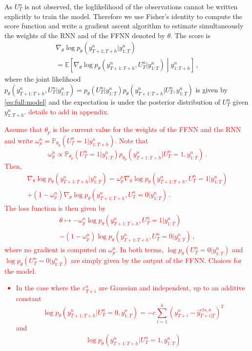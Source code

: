 \documentclass[letterpaper]{article} %
\newcommand{\ts}{y}
\newcommand{\etspred}{\hat{y}}
\begin{document}
As $U^n_T$ is not observed, the loglikelihood of the observations cannot be written explicitly to train the model. Therefore we use Fisher's identity to compute the score function and write a gradient ascent algorithm to estimate simultaneously the weights of the RNN and of the FFNN denoted by $\theta$. The score is
\begin{multline*}
\nabla_\theta \log p_\theta(\ts^n_{T+1:T+h}|\ts^n_{1:T})
\\ = \mathbb{E}\left[\nabla_\theta \log p_\theta(\ts^n_{T+1:T+h},U_T^n|\ts^n_{1:T})\middle|\ts^n_{1:T+h}\right]\,,
\end{multline*}
where the joint likelihood $p_\theta(\ts^n_{T+1:T+h},U_T^n|\ts^n_{1:T}) = p_\theta(U_T^n|\ts^n_{1:T})p_\theta(\ts^n_{T+1:T+h}|U_T^n,\ts^n_{1:T})$ is given by \eqref{eq:full:model} and the expectation is under the posterior distribution of $U_T^n$ given $\ts^n_{1:T+h}$.  \textcolor{red}{details to add in appendix.} \textcolor{red}{Assume that $\theta_p$ is the current value for the weights of the FFNN and the RNN and write $\omega_p^n = \mathbb{P}_{\theta_p}(U_T^n = 1|\ts^n_{1:T+h})$. Note that
$$
\omega_p^n \propto \mathbb{P}_{\theta_p}(U_T^n = 1|\ts^n_{1:T})p_{\theta_p}(\ts^n_{T+1:T+h}|U_T^n=1,\ts^n_{1:T})\,.
$$
Then,
\begin{multline*}
\nabla_\theta \log p_\theta(\ts^n_{T+1:T+h}|\ts^n_{1:T}) = \omega_p^n\nabla_\theta \log p_\theta(\ts^n_{T+1:T+h},U_T^n=1|\ts^n_{1:T})\\
+ (1-\omega_p^n)\nabla_\theta \log p_\theta(\ts^n_{T+1:T+h},U_T^n=0|\ts^n_{1:T})\,.
\end{multline*}
The loss function is then given by
\begin{multline*}
\theta\mapsto - \omega_p^n \log p_\theta(\ts^n_{T+1:T+h},U_T^n=1|\ts^n_{1:T})\\
- (1-\omega_p^n) \log p_\theta(\ts^n_{T+1:T+h},U_T^n=0|\ts^n_{1:T})\,,
\end{multline*} 
where no gradient is computed on $\omega_p^n$. In both terms, $\log p_\theta(U_T^n=0|\ts^n_{1:T})$ and $\log p_\theta(U_T^n=0|\ts^n_{1:T})$ are simply given by the output of the FFNN.  Choices for the model.
\begin{itemize}
\item In the case where the  $\varepsilon^n_{T+i}$ are Gaussian and independent, up to an additive constant
$$
\log p_\theta(\ts^n_{T+1:T+h}|U_T^n=0,\ts^n_{1:T}) = -c\sum_{i=1}^{h}(\ts^n_{T+i}  - \etspred^{ets,n}_{T+i|T})^2
$$
and
\begin{multline*}
\log p_\theta(\ts^n_{T+1:T+h}|U_T^n=1,\ts^n_{1:T})\\

\end{multline*}
\end{itemize}}
\end{document}
